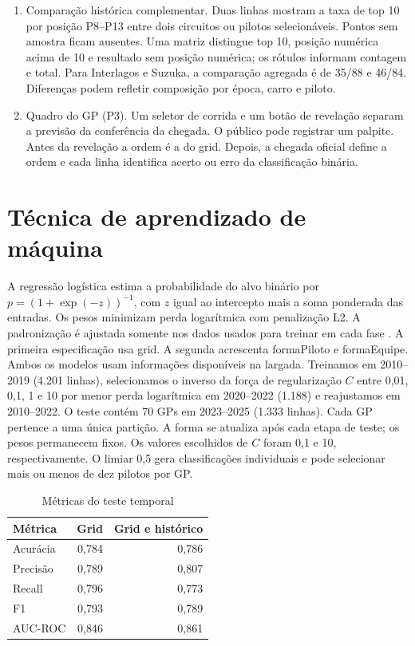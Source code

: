 \documentclass[conference,a4paper]{IEEEtran}
\begin{document}
\begin{enumerate}
\item Comparação histórica complementar. Duas linhas mostram a taxa de top 10 por posição P8--P13 entre dois circuitos ou pilotos selecionáveis. Pontos sem amostra ficam ausentes. Uma matriz distingue top 10, posição numérica acima de 10 e resultado sem posição numérica; os rótulos informam contagem e total. Para Interlagos e Suzuka, a comparação agregada é de 35/88 e 46/84. Diferenças podem refletir composição por época, carro e piloto.
\item Quadro do GP (P3). Um seletor de corrida e um botão de revelação separam a previsão da conferência da chegada. O público pode registrar um palpite. Antes da revelação a ordem é a do grid. Depois, a chegada oficial define a ordem e cada linha identifica acerto ou erro da classificação binária.
\end{enumerate}
\section{Técnica de aprendizado de máquina}
A regressão logística estima a probabilidade do alvo binário por $p=(1+\exp(-z))^{-1}$, com $z$ igual ao intercepto mais a soma ponderada das entradas. Os pesos minimizam perda logarítmica com penalização L2. A padronização é ajustada somente nos dados usados para treinar em cada fase \cite{sk}. A primeira especificação usa grid. A segunda acrescenta formaPiloto e formaEquipe. Ambos os modelos usam informações disponíveis na largada.
Treinamos em 2010--2019 (4.201 linhas), selecionamos o inverso da força de regularização $C$ entre 0,01, 0,1, 1 e 10 por menor perda logarítmica em 2020--2022 (1.188) e reajustamos em 2010--2022. O teste contém 70 GPs em 2023--2025 (1.333 linhas). Cada GP pertence a uma única partição. A forma se atualiza após cada etapa de teste; os pesos permanecem fixos. Os valores escolhidos de $C$ foram 0,1 e 10, respectivamente. O limiar 0,5 gera classificações individuais e pode selecionar mais ou menos de dez pilotos por GP.
\begin{table}[h]\centering\caption{Métricas do teste temporal}
\begin{tabular}{lrr}\hline Métrica&Grid&Grid e histórico\\\hline
Acurácia&0,784&0,786\\Precisão&0,789&0,807\\Recall&0,796&0,773\\F1&0,793&0,789\\AUC-ROC&0,846&0,861\\\hline
\end{tabular}\end{table}
\end{document}
